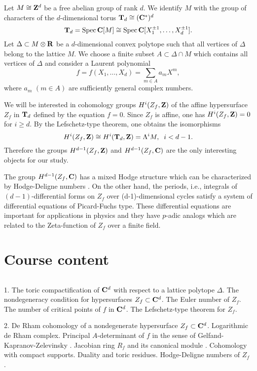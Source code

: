 Let $M \cong {\bf Z}^d$ be a free abelian group of rank $d$. We 
identify $M$ with the group of characters of the $d$-dimensional
torus ${\bf T}_d \cong  ({\bf C}^*)^d$ 
$${\bf T}_d = {\rm Spec}\, {\bf C}[M] \cong  
{\rm Spec}\, {\bf C}[X_1^{\pm 1}, \ldots, X_d^{\pm 1}].$$
Let $\Delta \subset M 
\otimes {\bf R}$  be a $d$-dimensional convex polytope  such that 
all vertices of $\Delta$ belong to 
the lattice $M$. We choose a finite subset $A \subset  \Delta \cap M$
which contains all vertices of $\Delta$ and   
consider a Laurent polynomial
\[ f= f(X_1, \ldots, X_d) = \sum_{ m \in A} a_m X^m, \]
where $a_m$ $(m \in A)$ are sufficiently general complex
numbers.  

We will be interested in cohomology groups $H^i(Z_f, {\bf Z})$ 
of the affine hypersurface $Z_f$ in 
${\bf T}_d$ defined by the equation $f =0$. Since $Z_f$ is affine, 
one has   $H^i(Z_f, {\bf Z}) =0$ for $i \geq d$. By the Lefschetz-type
theorem, one obtains the isomorphisms
\[ H^i(Z_f, {\bf Z}) \cong H^i({\bf T}_d, {\bf Z}) =  \Lambda^{i} M, 
\;\; i < d-1. \]
Therefore the groups  $H^{d-1}(Z_f, {\bf Z})$ and  $H^{d-1}(Z_f, {\bf C})$
are the only interesting objects for our study. 

The group  $H^{d-1}(Z_f, {\bf C})$ has a mixed Hodge structure which can 
be characterized by Hodge-Deligne numbers \cite{DH}. On the other hand, 
the periods, i.e., integrals of $(d-1)$-differential forms 
on $Z_f$ over (d-1)-dimensional 
cycles satisfy a system of differential equations of Picard-Fuchs type. 
These differential equations are important for applications in physics 
\cite{BS} and they  
have $p$-adic analogs \cite{Dwork} which are related to the Zeta-function 
of $Z_f$ over a finite field.



\section{Course content} 

$\;$

1. The toric compactification of ${\bf C}^d$  with respect to a lattice 
polytope $\Delta$. The nondegeneracy condition for hypersurfaces 
$Z_f \subset {\bf C}^d$. The Euler number of $Z_f$. The number of critical
points of $f$ in $ {\bf C}^d$. The Lefschetz-type theorem for $Z_f$. 


2. De Rham cohomology of a nondegenerate hypersurface 
$Z_f \subset {\bf C}^d$. Logarithmic de Rham complex. Principal 
$A$-determinant
of $f$ in the sense of Gelfand-Kapranov-Zelevin\-sky 
\cite{GKZ2}. Jacobian ring $R_f$ and 
its canonical  module \cite{B-duke}. 
Cohomology with compact supports. Duality and 
toric residues. Hodge-Deligne numbers of $Z_f$ \cite{BB1}. 


